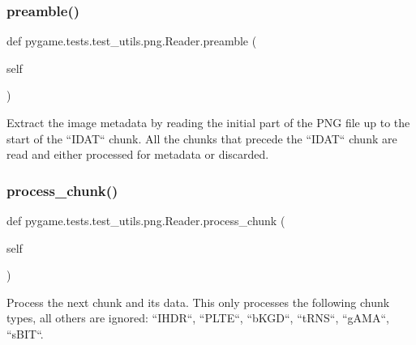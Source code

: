 \subsubsection{\texorpdfstring{preamble()}{preamble()}}
{\footnotesize\ttfamily def pygame.\+tests.\+test\+\_\+utils.\+png.\+Reader.\+preamble (\begin{DoxyParamCaption}\item[{}]{self }\end{DoxyParamCaption})}

\begin{DoxyVerb}Extract the image metadata by reading the initial part of the PNG
file up to the start of the ``IDAT`` chunk.  All the chunks that
precede the ``IDAT`` chunk are read and either processed for
metadata or discarded.
\end{DoxyVerb}
 \mbox{\label{classpygame_1_1tests_1_1test__utils_1_1png_1_1_reader_af4c692e0d7c3c40c6597b9c948eefadc}} 
\subsubsection{\texorpdfstring{process\+\_\+chunk()}{process\_chunk()}}
{\footnotesize\ttfamily def pygame.\+tests.\+test\+\_\+utils.\+png.\+Reader.\+process\+\_\+chunk (\begin{DoxyParamCaption}\item[{}]{self }\end{DoxyParamCaption})}

\begin{DoxyVerb}Process the next chunk and its data.  This only processes the
following chunk types, all others are ignored: ``IHDR``,
``PLTE``, ``bKGD``, ``tRNS``, ``gAMA``, ``sBIT``.
\end{DoxyVerb}
 \mbox{\label{classpygame_1_1tests_1_1test__utils_1_1png_1_1_reader_a00fe12c1b3ea423069ce36dee85943d8}} 
